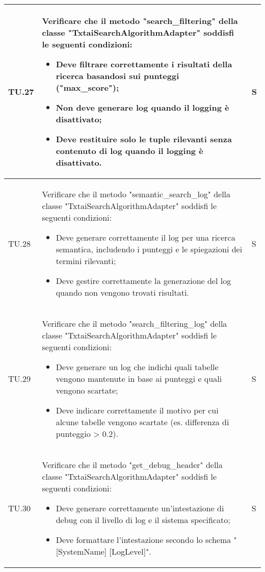 \begin{adjustwidth}{-0.5cm}{-0.5cm}
\begin{longtable}{|P{1.5cm}|>{\raggedright}P{9.5cm}|>{\arraybackslash}P{1.5cm}|}
		\hline TU.27 & Verificare che il metodo "search\_filtering" della classe "TxtaiSearchAlgorithmAdapter" soddisfi le seguenti condizioni:
		\begin{itemize}
			\item Deve filtrare correttamente i risultati della ricerca basandosi sui punteggi ("max\_score");
			\item Non deve generare log quando il logging è disattivato;
			\item Deve restituire solo le tuple rilevanti senza contenuto di log quando il logging è disattivato.
		\end{itemize} & S \\

		\hline TU.28 & Verificare che il metodo "semantic\_search\_log" della classe "TxtaiSearchAlgorithmAdapter" soddisfi le seguenti condizioni:
		\begin{itemize}
			\item Deve generare correttamente il log per una ricerca semantica, includendo i punteggi e le spiegazioni dei termini rilevanti;
			\item Deve gestire correttamente la generazione del log quando non vengono trovati risultati.
		\end{itemize} & S \\

		\hline TU.29 & Verificare che il metodo "search\_filtering\_log" della classe "TxtaiSearchAlgorithmAdapter" soddisfi le seguenti condizioni:
		\begin{itemize}
			\item Deve generare un log che indichi quali tabelle vengono mantenute in base ai punteggi e quali vengono scartate;
			\item Deve indicare correttamente il motivo per cui alcune tabelle vengono scartate (es. differenza di punteggio > 0.2).
		\end{itemize} & S \\

		\hline TU.30 & Verificare che il metodo "get\_debug\_header" della classe "TxtaiSearchAlgorithmAdapter" soddisfi le seguenti condizioni:
		\begin{itemize}
			\item Deve generare correttamente un'intestazione di debug con il livello di log e il sistema specificato;
			\item Deve formattare l'intestazione secondo lo schema "[SystemName] [LogLevel]".
		\end{itemize} & S \\


\end{longtable}
\end{adjustwidth}
